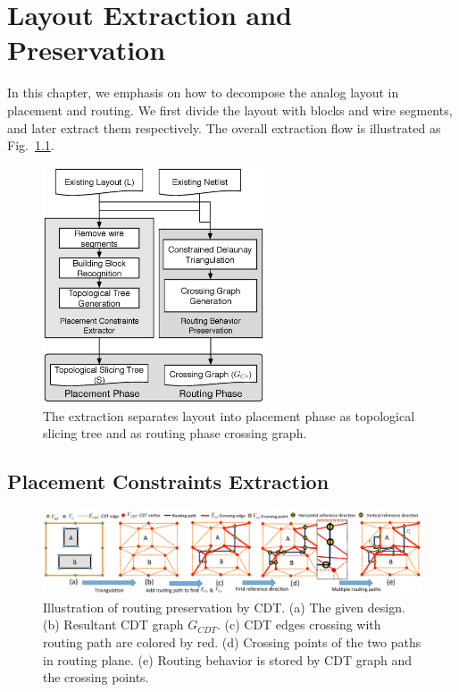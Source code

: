
\chapter{Layout Extraction and Preservation}\label{chap:LayoutExtPre}

  In this chapter, we emphasis on how to decompose the analog layout in placement and routing. We first divide the layout with blocks and wire segments, and later extract them respectively. The overall extraction flow is illustrated as Fig.~\ref{fig:ExtractFlow}. 

  \begin{figure}[t]
    \centering
    \includegraphics[height=7cm]{Fig/ExtractFlow.eps}
    \caption{The extraction separates layout into placement phase as topological slicing tree and as routing phase crossing graph.}
    \label{fig:ExtractFlow}
  \end{figure}


  \section{Placement Constraints Extraction}\label{sec:PlExtract}

    \begin{figure}[t]
      \begin{center}
      \includegraphics[width=\textwidth]{Fig/CGC.eps}
      \caption{Illustration of routing preservation by CDT. 
        (a) The given design.
        (b) Resultant CDT graph $G_{CDT}$.
        (c) CDT edges crossing with routing path are colored by red.
        (d) Crossing points of the two paths in routing plane.
        (e) Routing behavior is stored by CDT graph and the crossing points.}
      \label{fig:CGC}
      \end{center}
    \end{figure}

